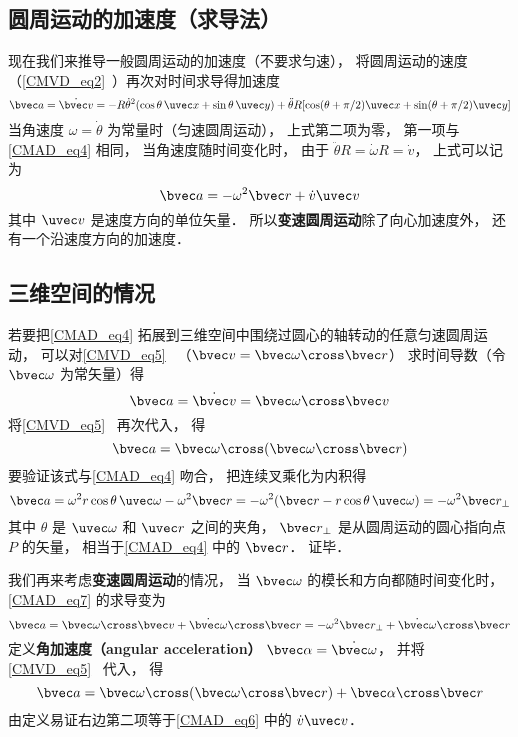 \subsection{圆周运动的加速度（求导法）}
现在我们来推导一般圆周运动的加速度（不要求匀速），  将圆周运动的速度（\autoref{CMVD_eq2}~）再次对时间求导得加速度
\begin{equation}
\bvec a = \dot {\bvec v} =  - R \dot\theta^2(\cos \theta\, \uvec x + \sin \theta\, \uvec y) + \ddot\theta R [\cos(\theta + \pi/2) \uvec x + \sin(\theta + \pi/2)\uvec y]
\end{equation}
当角速度 $\omega = \dot\theta$ 为常量时（匀速圆周运动）， 上式第二项为零， 第一项与\autoref{CMAD_eq4} 相同， 当角速度随时间变化时， 由于 $\ddot\theta R = \dot\omega R = \dot v$， 上式可以记为
\begin{equation}\label{CMAD_eq6}
\bvec a = - \omega ^2 \bvec r + \dot v \uvec v
\end{equation}
其中 $\uvec v$ 是速度方向的单位矢量． 所以\textbf{变速圆周运动}除了向心加速度外， 还有一个沿速度方向的加速度．

\subsection{三维空间的情况}
若要把\autoref{CMAD_eq4} 拓展到三维空间中围绕过圆心的轴转动的任意匀速圆周运动， 可以对\autoref{CMVD_eq5}~ （$\bvec v = \bvec\omega \cross \bvec r$） 求时间导数（令 $\bvec\omega$ 为常矢量）得
\begin{equation}\label{CMAD_eq7}
\bvec a = \dot{\bvec v} = \bvec\omega \cross \bvec v
\end{equation}
将\autoref{CMVD_eq5}~ 再次代入， 得
\begin{equation}\label{CMAD_eq9}
\bvec a =  \bvec\omega \cross (\bvec\omega \cross \bvec r)
\end{equation}
要验证该式与\autoref{CMAD_eq4} 吻合， 把连续叉乘化为内积得
\begin{equation}
\bvec a = \omega^2 r \cos\theta\, \uvec \omega - \omega^2 \bvec r = -\omega^2 (\bvec r - r\cos\theta\, \uvec\omega) = -\omega^2 \bvec r_\bot
\end{equation}
其中 $\theta$ 是 $\uvec\omega$ 和 $\uvec r$ 之间的夹角， $\bvec r_\bot$ 是从圆周运动的圆心指向点 $P$ 的矢量， 相当于\autoref{CMAD_eq4} 中的 $\bvec r$． 证毕．

我们再来考虑\textbf{变速圆周运动}的情况， 当 $\bvec\omega$ 的模长和方向都随时间变化时， \autoref{CMAD_eq7} 的求导变为
\begin{equation}
\bvec a = \bvec\omega \cross \bvec v + \dot{\bvec\omega} \cross \bvec r = -\omega^2 \bvec r_\bot + \dot{\bvec\omega} \cross \bvec r
\end{equation}
定义\textbf{角加速度（angular acceleration）} $\bvec\alpha = \dot{\bvec\omega}$， 并将\autoref{CMVD_eq5}~ 代入， 得
\begin{equation}
\bvec a =  \bvec\omega \cross (\bvec\omega \cross \bvec r) + \bvec\alpha\cross\bvec r
\end{equation}
由定义易证右边第二项等于\autoref{CMAD_eq6} 中的 $\dot v\uvec v$．
